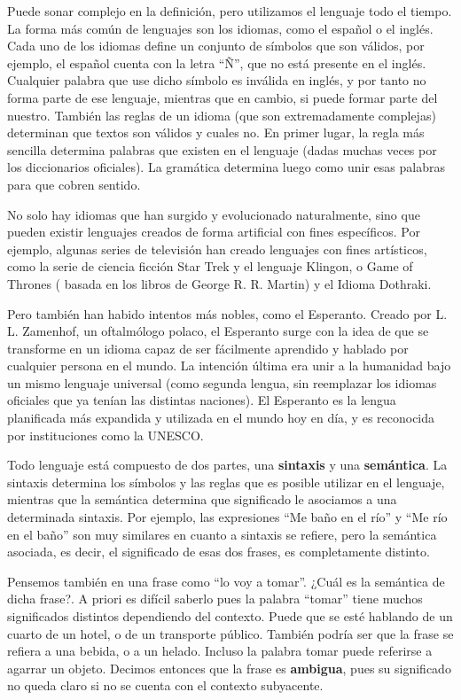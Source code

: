 Puede sonar complejo en la definición, pero utilizamos el lenguaje todo el tiempo.
La forma más común de lenguajes son los idiomas, como el español o el inglés.
Cada uno de los idiomas define un conjunto de símbolos que son válidos, por ejemplo,
el español cuenta con la letra ``Ñ'', que no está presente en el inglés. Cualquier
palabra que use dicho símbolo es inválida en inglés, y por tanto no forma parte de
ese lenguaje, mientras que en cambio, si puede formar parte del nuestro. También
las reglas de un idioma (que son extremadamente complejas) determinan que textos
son válidos y cuales no. En primer lugar, la regla más sencilla determina palabras
que existen en el lenguaje (dadas muchas veces por los diccionarios oficiales).
La gramática determina luego como unir esas palabras para que cobren sentido.

No solo hay idiomas que han surgido y evolucionado naturalmente, sino que pueden
existir lenguajes creados de forma artificial con fines específicos. Por ejemplo,
algunas series de televisión han creado lenguajes con fines artísticos, como la
serie de ciencia ficción Star Trek y el lenguaje Klingon, o Game of Thrones (
basada en los libros de George R. R. Martin) y el Idioma Dothraki.\autocite{littaur_2017}

Pero también han habido intentos más nobles, como el Esperanto. Creado por 
L. L. Zamenhof, un oftalmólogo polaco, el Esperanto surge con la idea de que se
transforme en un idioma capaz de ser fácilmente aprendido y hablado por cualquier
persona en el mundo. La intención última era unir a la humanidad bajo un mismo
lenguaje universal (como segunda lengua, sin reemplazar los idiomas oficiales
que ya tenían las distintas naciones). El Esperanto es la
lengua planificada más expandida y utilizada en el mundo hoy en día, y es
reconocida por instituciones como la UNESCO.

Todo lenguaje está compuesto de dos partes, una \textbf{sintaxis} y una
\textbf{semántica}. La sintaxis determina los símbolos y las reglas que es posible
utilizar en el lenguaje, mientras que la semántica determina que significado le
asociamos a una determinada sintaxis. Por ejemplo, las expresiones ``Me baño en
el río'' y ``Me río en el baño'' son muy similares en cuanto a sintaxis se refiere,
pero la semántica asociada, es decir, el significado de esas dos frases, es completamente
distinto.

Pensemos también en una frase como ``lo voy a tomar''. ¿Cuál es la semántica de
dicha frase?. A priori es difícil saberlo pues la palabra ``tomar'' tiene
muchos significados distintos dependiendo del contexto. Puede que se esté hablando
de un cuarto de un hotel, o de un transporte público. También podría ser que la
frase se refiera a una bebida, o a un helado. Incluso la palabra tomar puede
referirse a agarrar un objeto. Decimos entonces que la frase es \textbf{ambigua},
pues su significado no queda claro si no se cuenta con el contexto subyacente.

